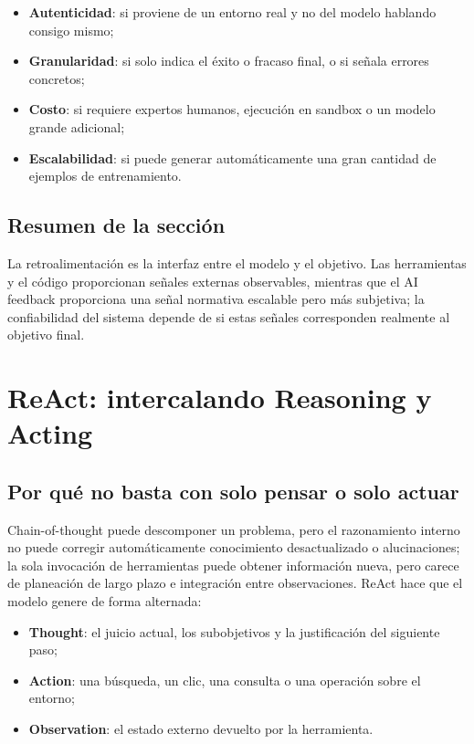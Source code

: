 \documentclass[a4paper]{article}
\begin{document}
\begin{itemize}
    \item \textbf{Autenticidad}: si proviene de un entorno real y no del modelo hablando consigo mismo;
    \item \textbf{Granularidad}: si solo indica el éxito o fracaso final, o si señala errores concretos;
    \item \textbf{Costo}: si requiere expertos humanos, ejecución en sandbox o un modelo grande adicional;
    \item \textbf{Escalabilidad}: si puede generar automáticamente una gran cantidad de ejemplos de entrenamiento.
\end{itemize}

\subsection{Resumen de la sección}

La retroalimentación es la interfaz entre el modelo y el objetivo. Las herramientas y el código proporcionan señales externas observables, mientras que el AI feedback proporciona una señal normativa escalable pero más subjetiva; la confiabilidad del sistema depende de si estas señales corresponden realmente al objetivo final.

\section{ReAct: intercalando Reasoning y Acting}

\subsection{Por qué no basta con solo pensar o solo actuar}

Chain-of-thought puede descomponer un problema, pero el razonamiento interno no puede corregir automáticamente conocimiento desactualizado o alucinaciones; la sola invocación de herramientas puede obtener información nueva, pero carece de planeación de largo plazo e integración entre observaciones. ReAct hace que el modelo genere de forma alternada:

\begin{itemize}
    \item \textbf{Thought}: el juicio actual, los subobjetivos y la justificación del siguiente paso;
    \item \textbf{Action}: una búsqueda, un clic, una consulta o una operación sobre el entorno;
    \item \textbf{Observation}: el estado externo devuelto por la herramienta.
\end{itemize}
\end{document}
